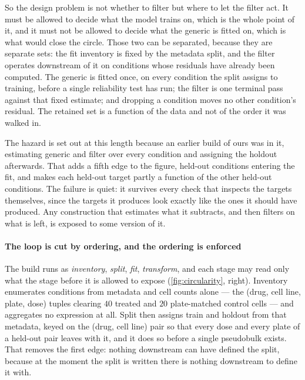 So the design problem is not whether to filter but where to let the filter act. It
must be allowed to decide what the model trains on, which is the whole point of
it, and it must not be allowed to decide what the generic is fitted on, which is
what would close the circle. Those two can be separated, because they are separate
sets: the fit inventory is fixed by the metadata split, and the filter operates
downstream of it on conditions whose residuals have already been computed. The
generic is fitted once, on every condition the split assigns to training, before a
single reliability test has run; the filter is one terminal pass against that
fixed estimate; and dropping a condition moves no other condition's residual. The
retained set is a function of the data and not of the order it was walked in.

The hazard is set out at this length because an earlier build of ours was in it,
estimating generic and filter over every condition and assigning the holdout
afterwards. That adds a fifth edge to the figure, held-out conditions entering the
fit, and makes each held-out target partly a function of the other held-out
conditions. The failure is quiet: it survives every check that inspects the
targets themselves, since the targets it produces look exactly like the ones it
should have produced. Any construction that estimates what it subtracts, and then
filters on what is left, is exposed to some version of it.

\paragraph{The loop is cut by ordering, and the ordering is enforced} The build runs
as \emph{inventory}, \emph{split}, \emph{fit}, \emph{transform}, and each stage may
read only what the stage before it is allowed to expose (\cref{fig:circularity},
right). Inventory enumerates conditions from metadata and cell counts alone --- the
(drug, cell line, plate, dose) tuples clearing $40$ treated and $20$ plate-matched
control cells --- and aggregates no expression at all. Split then assigns train and
holdout from that metadata, keyed on the (drug, cell line) pair so that every dose
and every plate of a held-out pair leaves with it, and it does so before a single
pseudobulk exists. That removes the first edge: nothing downstream can have defined
the split, because at the moment the split is written there is nothing downstream to
define it with.

